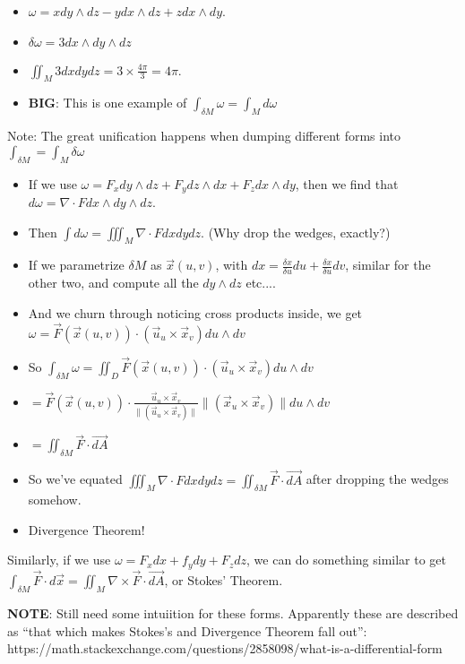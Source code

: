 \documentclass[11pt, oneside]{article}   	%
\begin{document}
\begin{itemize}
\item $\omega = x dy \wedge dz -ydx\wedge dz + z dx \wedge dy$.  
\item $\delta \omega = 3 dx \wedge dy \wedge dz$
\item $\iint_M 3dxdydz = 3 \times \frac{4\pi}{3} = 4\pi$.
\item \textbf{BIG}: This is one example of $\int_{\delta M} \omega = \int_M d\omega$
\end{itemize}

Note: The great unification happens when dumping different forms into $\int_{\delta M} = \int_M \delta \omega$

\begin{itemize}
\item If we use $\omega = F_x dy \wedge dz + F_y dz \wedge dx + F_z dx \wedge dy$, then we find that $d\omega = \nabla \cdot F dx \wedge dy \wedge dz$.
\item Then $\int d\omega = \iiint_M  \nabla \cdot F dx dy  dz$. (Why drop the wedges, exactly?)
\item If we parametrize $\delta M $ as $\vec{x}(u,v)$, with $dx = \frac{\delta x}{\delta u}du + \frac{\delta x}{\delta u}dv$, similar for the other two, and compute all the $dy \wedge dz$ etc....
\item And we churn through noticing cross products inside, we get $\omega = \vec{F}(\vec{x}(u,v)) \cdot (\vec{u}_u \times \vec{x}_v)du \wedge dv$
\item So $\int_{\delta M} \omega = \iint_D \vec{F}(\vec{x}(u,v)) \cdot (\vec{u}_u \times \vec{x}_v)du \wedge dv$
\item $=\vec{F}(\vec{x}(u,v)) \cdot \frac{\vec{u}_u \times \vec{x}_v}{\| (\vec{u}_u \times \vec{x}_v)\|}  \|(\vec{x}_u \times \vec{x}_v)\|  du \wedge dv$ 
\item $=\iint_{\delta M} \vec{F} \cdot \vec{dA}$
\item So we've equated $\iiint_M \nabla \cdot F dx dy dz =\iint_{\delta M} \vec{F} \cdot \vec{dA}$ after dropping the wedges somehow.
\item Divergence Theorem!
\end{itemize}

Similarly, if we use $\omega = F_x dx + f_y dy + F_z dz$, we can do something similar to get $\int_{\delta M} \vec{F} \cdot d\vec{x} = \iint_M \nabla \times \vec{F} \cdot \vec{dA}$, or Stokes' Theorem.

\textbf{NOTE}: Still need some intuiition for these forms.  Apparently these are described as ``that which makes Stokes's and Divergence Theorem fall out'': https://math.stackexchange.com/questions/2858098/what-is-a-differential-form
\end{document}
